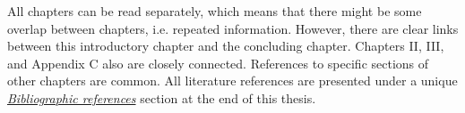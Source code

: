 All chapters can be read separately, which means that there might be some overlap between chapters, 
i.e. repeated information. However, there are clear links between this introductory chapter 
and the concluding chapter. Chapters II, III, and Appendix C also are closely connected. References 
to specific sections of other chapters are common. All literature references are presented under a
unique \hyperref[chap:references]{\textit{Bibliographic references}} section at the end of this
thesis.
